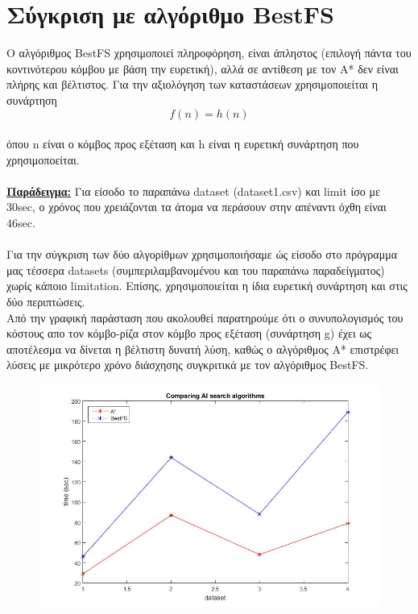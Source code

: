 \documentclass[12pt]{article}
\begin{document}
\section*{Σύγκριση με αλγόριθμο BestFS}
Ο αλγόριθμος BestFS χρησιμοποιεί πληροφόρηση, είναι άπληστος (επιλογή πάντα του κοντινότερου κόμβου με βάση την ευρετική), αλλά σε αντίθεση με τον A* δεν είναι πλήρης και βέλτιστος.  Για την αξιολόγηση των καταστάσεων χρησιμοποιείται η συνάρτηση
 \begin{equation*}
        f(n) = h(n)
\end{equation*}\\
όπου n είναι ο κόμβος προς εξέταση και h είναι η ευρετική συνάρτηση που χρησιμοποείται.\\\\
\textbf{\underline{Παράδειγμα:}} Για είσοδο το παραπάνω dataset (dataset1.csv) και limit ίσο με 30sec, ο χρόνος που χρειάζονται τα άτομα να περάσουν στην απέναντι όχθη είναι 46sec.\\\\
Για την σύγκριση των δύο αλγορίθμων χρησιμοποιήσαμε ώς είσοδο στο πρόγραμμα μας τέσσερα datasets (συμπεριλαμβανομένου και του παραπάνω παραδείγματος) χωρίς κάποιο limitation. Επίσης, χρησιμοποιείται η ίδια ευρετική συνάρτηση και στις δύο περιπτώσεις.\\
Από την γραφική παράσταση που ακολουθεί παρατηρούμε ότι ο συνυπολογισμός του κόστους απο τον κόμβο-ρίζα στον κόμβο προς εξέταση (συνάρτηση g) έχει ως αποτέλεσμα να δίνεται η βέλτιστη δυνατή λύση, καθώς ο αλγόριθμος A* επιστρέφει λύσεις με μικρότερο χρόνο διάσχησης συγκριτικά με τον αλγόριθμος BestFS.
\begin{figure}[H]
        \centering
        \includegraphics[scale=.7]{images/ai_res}
     \end{figure}
\end{document}
